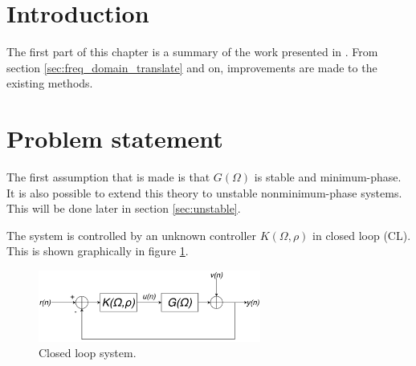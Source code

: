 \label{sec:model_reference_control}
\section{Introduction}
The first part of this chapter is a summary of the work presented in \cite{Data-driven_model_reference_control}. From section \ref{sec:freq_domain_translate} and on, improvements are made to the existing methods.

\section{Problem statement}
The first assumption that is made is that $G(\Omega)$ is stable and minimum-phase. It is also possible to extend this theory to unstable nonminimum-phase systems. This will be done later in section \ref{sec:unstable}.

The system is controlled by an unknown controller $K(\Omega,\rho)$ in closed loop (CL). This is shown graphically in figure \ref{fig:closed_loop_system}.

\begin{figure}[H]
    \centering
    \includegraphics[width = 0.65\textwidth]{figures/closed_loop_system.pdf}
    \caption{Closed loop system.}
    \label{fig:closed_loop_system}
\end{figure}

